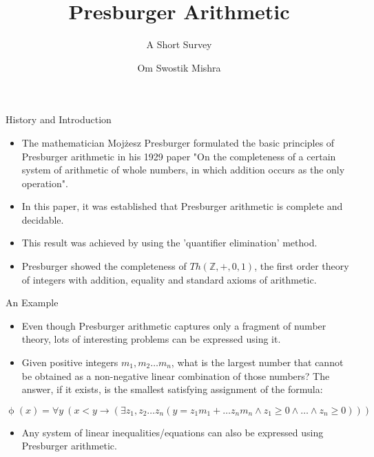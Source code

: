 \documentclass[10pt]{beamer}
\title{Presburger Arithmetic}
\subtitle{A Short Survey}
\date{}
\author{Om Swostik Mishra}
\institute{IIT Bombay}
\begin{document}
\begin{frame}
    \maketitle
\end{frame}

\begin{frame}{History and Introduction}
    \begin{itemize}
        \item The mathematician Mojżesz Presburger formulated the basic principles of Presburger arithmetic in his 1929 paper 
        "On the completeness of a certain system of arithmetic of whole numbers, in which addition occurs as the only operation".
        \item In this paper, it was established that Presburger arithmetic is complete and decidable.
        \item This result was achieved by using the 'quantifier elimination' method.
        \item Presburger showed the completeness of $Th(\mathbb{Z},+,0,1)$, the first order theory of integers with addition, equality and standard axioms of arithmetic.
    \end{itemize}
\end{frame}
\begin{frame}{An Example}
    \begin{itemize}
    \item Even though Presburger arithmetic captures only a fragment of number theory, lots of interesting problems can be expressed
    using it. 
    \item Given positive integers $m_1,m_2\dots m_n$, what is the largest number that cannot be obtained
    as a non-negative linear combination of those numbers?
    The answer, if it exists, is the smallest satisfying assignment of the formula:
    \end{itemize}
    \[\upphi(x) =\forall y\: (x < y \rightarrow (\exists z_1,z_2\dots z_n(y=z_1m_1+\dots z_nm_n\wedge z_1\geq 0 \wedge \dots \wedge z_n\geq 0)))\]
    \begin{itemize}
    \item Any system of linear inequalities/equations can also be expressed using Presburger arithmetic.
    \end{itemize}
\end{frame}
\end{document}
